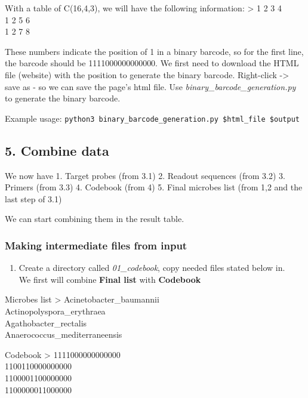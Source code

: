 \documentclass[
]{article}
\providecommand{\tightlist}{%
  \setlength{\itemsep}{0pt}\setlength{\parskip}{0pt}}
\begin{document}
With a table of C(16,4,3), we will have the following information:
\textgreater{} 1 2 3 4\\
1 2 5 6\\
1 2 7 8

These numbers indicate the position of 1 in a binary barcode, so for the
first line, the barcode should be 1111000000000000. We first need to
download the HTML file (website) with the position to generate the
binary barcode. Right-click -\textgreater{} save as - so we can save the
page's html file. Use \emph{binary\_barcode\_generation.py} to generate
the binary barcode.

Example usage:
\texttt{python3\ binary\_barcode\_generation.py\ \$html\_file\ \$output}

\subsection{5. Combine data}\label{combine-data}

We now have 1. Target probes (from 3.1) 2. Readout sequences (from 3.2)
3. Primers (from 3.3) 4. Codebook (from 4) 5. Final microbes list (from
1,2 and the last step of 3.1)

We can start combining them in the result table.

\subsubsection{Making intermediate files from
input}\label{making-intermediate-files-from-input}

\begin{enumerate}
\def\labelenumi{\arabic{enumi}.}
\tightlist
\item
  Create a directory called \emph{01\_codebook}, copy needed files
  stated below in.\\
  We first will combine \textbf{Final list} with \textbf{Codebook}
\end{enumerate}

Microbes list \textgreater{} Acinetobacter\_baumannii\\
Actinopolyspora\_erythraea\\
Agathobacter\_rectalis\\
Anaerococcus\_mediterraneensis

Codebook \textgreater{} 1111000000000000\\
1100110000000000\\
1100001100000000\\
1100000011000000
\end{document}
